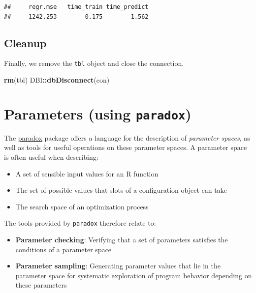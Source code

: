 \documentclass[]{scrbook}
\newenvironment{Shaded}{\begin{snugshade}}{\end{snugshade}}
\newcommand{\KeywordTok}[1]{\textcolor[rgb]{0.13,0.29,0.53}{\textbf{#1}}}
\newcommand{\NormalTok}[1]{#1}
\newcommand{\OperatorTok}[1]{\textcolor[rgb]{0.81,0.36,0.00}{\textbf{#1}}}
\providecommand{\tightlist}{%
  \setlength{\itemsep}{0pt}\setlength{\parskip}{0pt}}
\renewenvironment{Shaded} {\begin{snugshade}\small} {\end{snugshade}}
\begin{document}
\begin{verbatim}
##     regr.mse   time_train time_predict 
##     1242.253        0.175        1.562
\end{verbatim}

\hypertarget{cleanup}{%
\subsection{Cleanup}\label{cleanup}}

Finally, we remove the \texttt{tbl} object and close the connection.

\begin{Shaded}
\begin{Highlighting}[]
\KeywordTok{rm}\NormalTok{(tbl)}
\NormalTok{DBI}\OperatorTok{::}\KeywordTok{dbDisconnect}\NormalTok{(con)}
\end{Highlighting}
\end{Shaded}

\hypertarget{paradox}{%
\section{\texorpdfstring{Parameters (using \texttt{paradox})}{Parameters (using paradox)}}\label{paradox}}

The \href{https://paradox.mlr-org.com}{paradox} package offers a language for the description of \emph{parameter spaces}, as well as tools for useful operations on these parameter spaces.
A parameter space is often useful when describing:

\begin{itemize}
\tightlist
\item
  A set of sensible input values for an R function
\item
  The set of possible values that slots of a configuration object can take
\item
  The search space of an optimization process
\end{itemize}

The tools provided by \texttt{paradox} therefore relate to:

\begin{itemize}
\tightlist
\item
  \textbf{Parameter checking}: Verifying that a set of parameters satisfies the conditions of a parameter space
\item
  \textbf{Parameter sampling}: Generating parameter values that lie in the parameter space for systematic exploration of program behavior depending on these parameters
\end{itemize}
\end{document}
